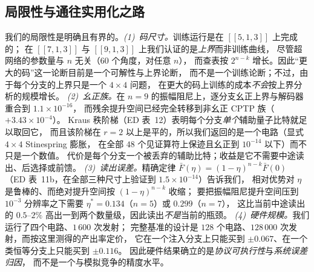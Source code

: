 \documentclass[11pt,a4paper]{article}
\begin{document}
\subsection*{局限性与通往实用化之路}

我们的局限性是明确且有界的。\emph{(1)~码尺寸。}训练运行是在 $[\![5,1,3]\!]$ 上完成的；
在 $[\![7,1,3]\!]$ 与 $[\![9,1,3]\!]$ 上我们认证的是\emph{上界}而非训练曲线，
尽管超网络的参数量与 $n$ 无关（$60$ 个角度，对任意 $n$），
而查表按 $2^{n-k}$ 增长。因此“更大的码”这一论断目前是一个可解性与上界论断，
而不是一个训练论断；不过，由于每个分支的上界只是一个 $4\times4$ 问题，
在更大的码上训练的成本\emph{不会}按上界分析的规模增长。
\emph{(2)~幺正族。}在 $n=9$ 的振幅阻尼上，逐分支幺正上界与解码器重合到 $1.1\times10^{-16}$，
而残余提升空间已经完全转移到非幺正 CPTP 族（$+3.43\times10^{-4}$）。
Kraus 秩阶梯（ED 表~12）表明每个分支\emph{单个}辅助量子比特就足以取回它，
而且该阶梯在 $r=2$ 以上是平的，所以我们返回的是一个电路（显式 $4\times4$ Stinespring 膨胀，
在全部 $48$ 个见证算符上保迹且幺正到 $10^{-14}$ 以下）而不只是一个数值。
代价是每个分支一个被丢弃的辅助比特；收益是它不需要中途读出、后选择或前馈。
\emph{(3)~读出误差。}精确定律 $\bar F(\eta)=(1-\eta)^{n-k}\bar F(0)$
（ED 表~11b，在全部三种尺寸上验证到 $1.5\times10^{-14}$）告诉我们，
相对优势对 $\eta$ 是鲁棒的、而绝对提升空间按 $(1-\eta)^{n-k}$ 收缩；
要把振幅阻尼提升空间压到 $10^{-3}$ 分辨率之下需要 $\eta^\ast=0.134$（$n=5$）或 $0.299$（$n=7$），
这比当前中途读出的 $0.5$--$2\%$ 高出一到两个数量级，因此读出\emph{不是}当前的瓶颈。
\emph{(4)~硬件规模。}我们运行了四个电路、$1\,600$ 次发射；
完整基准的设计是 $128$ 个电路、$128\,000$ 次发射，而按这里测得的产出率定价，
它在一个注入分支上只能买到 $\pm0.067$、在一个类恒等分支上只能买到 $\pm0.116$。
因此硬件结果确立的是\emph{协议可执行性}与\emph{系统误差归因}，
而不是一个与模拟竞争的精度水平。
\end{document}
